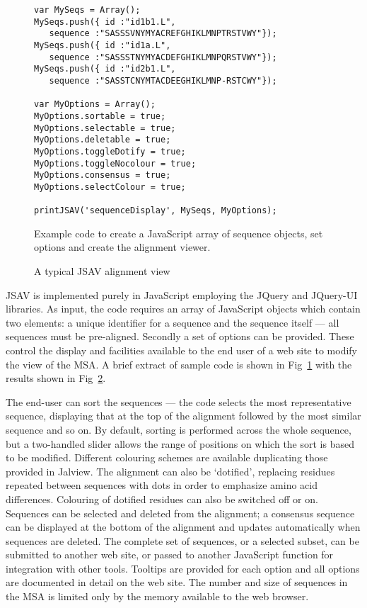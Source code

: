 \documentclass[a4]{article}
\begin{document}
\begin{figure}
\footnotesize
\begin{verbatim}
var MySeqs = Array();
MySeqs.push({ id :"id1b1.L",  
   sequence :"SASSSVNYMYACREFGHIKLMNPTRSTVWY"});
MySeqs.push({ id :"id1a.L",   
   sequence :"SASSSTNYMYACDEFGHIKLMNPQRSTVWY"});
MySeqs.push({ id :"id2b1.L",  
   sequence :"SASSTCNYMTACDEEGHIKLMNP-RSTCWY"});

var MyOptions = Array();
MyOptions.sortable = true;
MyOptions.selectable = true;
MyOptions.deletable = true;
MyOptions.toggleDotify = true;
MyOptions.toggleNocolour = true;
MyOptions.consensus = true;
MyOptions.selectColour = true;

printJSAV('sequenceDisplay', MySeqs, MyOptions);
\end{verbatim}
\caption{\label{fig:code}Example code to create a
JavaScript array of sequence objects, set options and 
create the alignment viewer.}
\end{figure}

\begin{figure}
\caption{\label{fig:demo}A typical JSAV alignment view}
\end{figure}


JSAV is implemented purely in JavaScript employing the JQuery and
JQuery-UI libraries. As input, the code requires an array of
JavaScript objects which contain two elements: a unique identifier for
a sequence and the sequence itself --- all sequences must be
pre-aligned.  Secondly a set of options can be provided. These control
the display and facilities available to the end user of a web site to
modify the view of the MSA.  A brief extract of sample code is shown
in Fig~\ref{fig:code} with the results shown in Fig~\ref{fig:demo}.

The end-user can sort the sequences --- the code selects the most
representative sequence, displaying that at the top of the alignment
followed by the most similar sequence and so on. By default, sorting
is performed across the whole sequence, but a two-handled slider
allows the range of positions on which the sort is based to be
modified. Different colouring schemes are available duplicating those
provided in Jalview. The alignment can also be `dotified', replacing
residues repeated between sequences with dots in order to emphasize
amino acid differences. Colouring of dotified residues can also be
switched off or on. Sequences can be selected and deleted from the
alignment; a consensus sequence can be displayed at the bottom of the
alignment and updates automatically when sequences are deleted. The
complete set of sequences, or a selected subset, can be submitted to
another web site, or passed to another JavaScript function for
integration with other tools. Tooltips are provided for each option
and all options are documented in detail on the web site. The number
and size of sequences in the MSA is limited only by the memory
available to the web browser.
\end{document}
